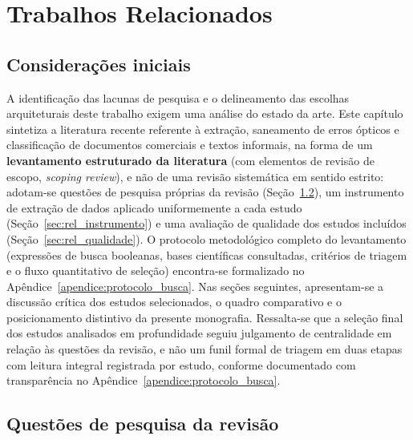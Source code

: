 \chapter{Trabalhos Relacionados}
\label{chp:trabalhos_relacionados}

\section{Considerações iniciais}
\label{sec:rel_consideracoes_iniciais}

A identificação das lacunas de pesquisa e o delineamento das escolhas arquiteturais deste trabalho exigem uma análise do estado da arte. Este capítulo sintetiza a literatura recente referente à extração, saneamento de erros ópticos e classificação de documentos comerciais e textos informais, na forma de um \textbf{levantamento estruturado da literatura} (com elementos de revisão de escopo, \textit{scoping review}), e não de uma revisão sistemática em sentido estrito: adotam-se questões de pesquisa próprias da revisão (Seção~\ref{sec:rel_questoes_pesquisa}), um instrumento de extração de dados aplicado uniformemente a cada estudo (Seção~\ref{sec:rel_instrumento}) e uma avaliação de qualidade dos estudos incluídos (Seção~\ref{sec:rel_qualidade}). O protocolo metodológico completo do levantamento (expressões de busca booleanas, bases científicas consultadas, critérios de triagem e o fluxo quantitativo de seleção) encontra-se formalizado no Apêndice~\ref{apendice:protocolo_busca}. Nas seções seguintes, apresentam-se a discussão crítica dos estudos selecionados, o quadro comparativo e o posicionamento distintivo da presente monografia. Ressalta-se que a seleção final dos estudos analisados em profundidade seguiu julgamento de centralidade em relação às questões da revisão, e não um funil formal de triagem em duas etapas com leitura integral registrada por estudo, conforme documentado com transparência no Apêndice~\ref{apendice:protocolo_busca}.

\section{Questões de pesquisa da revisão}
\label{sec:rel_questoes_pesquisa}

